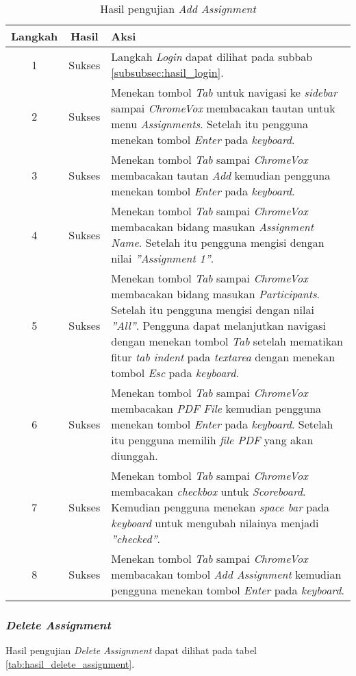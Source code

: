 \begin{table}[H]
	\centering
	\caption{Hasil pengujian \textit{Add Assignment}}
	\label{tab:hasil_add_assignment}
	\begin{tabular}{|c|c|p{12cm}|}
		\toprule
		Langkah & Hasil & Aksi\\
		\midrule
		1 & Sukses & Langkah \textit{Login} dapat dilihat pada subbab \ref{subsubsec:hasil_login}.\\
		2 & Sukses & Menekan tombol \textit{Tab} untuk navigasi ke \textit{sidebar} sampai \textit{ChromeVox} membacakan tautan untuk menu \textit{Assignments}. Setelah itu pengguna menekan tombol \textit{Enter} pada \textit{keyboard}.\\
		3 & Sukses & Menekan tombol \textit{Tab} sampai \textit{ChromeVox} membacakan tautan \textit{Add} kemudian pengguna menekan tombol \textit{Enter} pada \textit{keyboard}.\\
		4 & Sukses & Menekan tombol \textit{Tab} sampai \textit{ChromeVox} membacakan bidang masukan \textit{Assignment Name}. Setelah itu pengguna mengisi dengan nilai \textit{''Assignment 1''}.\\
		5 & Sukses & Menekan tombol \textit{Tab} sampai \textit{ChromeVox} membacakan bidang masukan \textit{Participants}. Setelah itu pengguna mengisi dengan nilai \textit{''All''}. Pengguna dapat melanjutkan navigasi dengan menekan tombol \textit{Tab} setelah mematikan fitur \textit{tab indent} pada \textit{textarea} dengan menekan tombol \textit{Esc} pada \textit{keyboard}.\\
		6 & Sukses & Menekan tombol \textit{Tab} sampai \textit{ChromeVox} membacakan \textit{PDF File} kemudian pengguna menekan tombol \textit{Enter} pada \textit{keyboard}. Setelah itu pengguna memilih \textit{file PDF} yang akan diunggah.\\
		7 & Sukses & Menekan tombol \textit{Tab} sampai \textit{ChromeVox} membacakan \textit{checkbox} untuk \textit{Scoreboard}. Kemudian pengguna menekan \textit{space bar} pada \textit{keyboard} untuk mengubah nilainya menjadi \textit{''checked''}.\\
		8 & Sukses & Menekan tombol \textit{Tab} sampai \textit{ChromeVox} membacakan tombol \textit{Add Assignment} kemudian pengguna menekan tombol \textit{Enter} pada \textit{keyboard}.\\
		\bottomrule
	\end{tabular}
\end{table}

\subsubsection{\textit{Delete Assignment}}
\label{subsubsec:hasil_delete_assignment}
Hasil pengujian \textit{Delete Assignment} dapat dilihat pada tabel \ref{tab:hasil_delete_assignment}.

